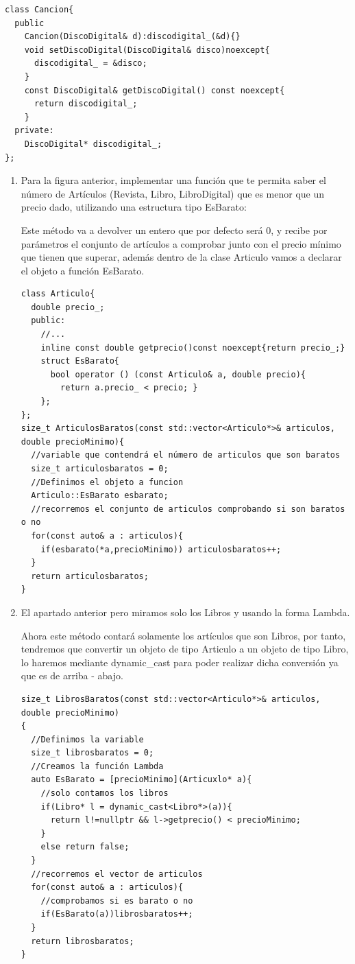\begin{enumerate}[label = \alph*)]
\begin{verbatim}
class Cancion{
  public
    Cancion(DiscoDigital& d):discodigital_(&d){}
    void setDiscoDigital(DiscoDigital& disco)noexcept{
      discodigital_ = &disco;
    }
    const DiscoDigital& getDiscoDigital() const noexcept{
      return discodigital_;
    } 
  private:
    DiscoDigital* discodigital_;
};
\end{verbatim}
\end{enumerate}

\begin{enumerate}
  \item Para la figura anterior, implementar una función que te permita saber el número de Artículos (Revista, Libro, LibroDigital) que es menor que un precio dado, utilizando una estructura tipo EsBarato:

  Este método va a devolver un entero que por defecto será 0, y recibe por parámetros el conjunto de artículos a comprobar junto con el precio mínimo que tienen que superar, además dentro de la clase Articulo vamos a declarar el objeto a función EsBarato.

\begin{verbatim}
class Articulo{
  double precio_;
  public:
    //...
    inline const double getprecio()const noexcept{return precio_;}
    struct EsBarato{
      bool operator () (const Articulo& a, double precio){
        return a.precio_ < precio; }
    };
};
size_t ArticulosBaratos(const std::vector<Articulo*>& articulos, double precioMinimo){
  //variable que contendrá el número de articulos que son baratos
  size_t articulosbaratos = 0;
  //Definimos el objeto a funcion
  Articulo::EsBarato esbarato;
  //recorremos el conjunto de articulos comprobando si son baratos o no 
  for(const auto& a : articulos){
    if(esbarato(*a,precioMinimo)) articulosbaratos++;
  }
  return articulosbaratos;
}
\end{verbatim}
  \item El apartado anterior pero miramos solo los Libros y usando la forma Lambda.

  Ahora este método contará solamente los artículos que son Libros, por tanto, tendremos que convertir un objeto de tipo Articulo a un objeto de tipo Libro, lo haremos mediante dynamic\_cast para poder realizar dicha conversión ya que es de arriba - abajo.
\begin{verbatim}
size_t LibrosBaratos(const std::vector<Articulo*>& articulos, double precioMinimo)
{
  //Definimos la variable
  size_t librosbaratos = 0;
  //Creamos la función Lambda
  auto EsBarato = [precioMinimo](Articuxlo* a){
    //solo contamos los libros
    if(Libro* l = dynamic_cast<Libro*>(a)){
      return l!=nullptr && l->getprecio() < precioMinimo;
    }
    else return false;
  }
  //recorremos el vector de articulos
  for(const auto& a : articulos){
    //comprobamos si es barato o no
    if(EsBarato(a))librosbaratos++;
  }
  return librosbaratos;
}
\end{verbatim}


\end{enumerate}
